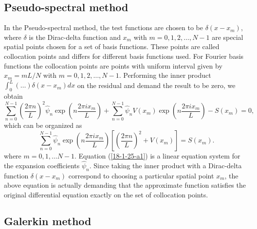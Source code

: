 \documentclass{article}
\begin{document}
\subsection{Pseudo-spectral method}

In the Pseudo-spectral method, the test functions are chosen to be $\delta (x
- x_m)$, where $\delta$ is the Dirac-delta function and $x_m$ with $m = 0, 1,
2, \ldots, N - 1$ are special spatial points chosen for a set of basis
functions. These points are called collocation points and differs for
different basis functions used. For Fourier basis functions the collocation
points are points with uniform interval given by $x_m = m L / N$ with $m = 0,
1, 2, \ldots, N - 1$. Performing the inner product $\int_0^L (\ldots) \delta
(x - x_m) d x$ on the residual and demand the result to be zero, we obtain
\begin{equation}
  \sum_{n = 0}^{N - 1} \left( \frac{2 \pi n}{L} \right)^2 \hat{\psi}_n \exp
  \left( n \frac{2 \pi i x_m}{L} \right) + \sum_{n = 0}^{N - 1} \hat{\psi}_n V
  (x_m) \exp \left( n \frac{2 \pi i x_m}{L} \right) - S (x_m) = 0,
\end{equation}
which can be organized as
\begin{equation}
  \label{18-1-25-a1} \sum_{n = 0}^{N - 1} \hat{\psi}_n \exp \left( n \frac{2
  \pi i x_m}{L} \right) \left[ \left( \frac{2 \pi n}{L} \right)^2 + V (x_m)
  \right] = S (x_m) .
\end{equation}
where $m = 0, 1, \ldots N - 1$. Equation (\ref{18-1-25-a1}) is a linear
equation system for the expansion coefficients $\hat{\psi}_n$. Since taking
the inner product with a Dirac-delta function $\delta (x - x_m)$ correspond to
choosing a particular spatial point $x_m$, the above equation is actually
demanding that the approximate function satisfies the original differential
equation exactly on the set of collocation points.

\subsection{Galerkin method}
\end{document}
